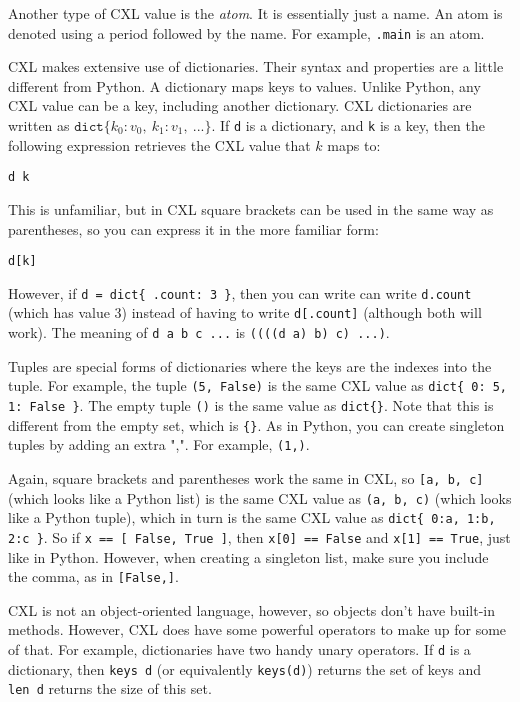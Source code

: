 \documentclass{report}
\newenvironment{code}{
\tcolorbox
}{
\endtcolorbox
}
\begin{document}
Another type of CXL value is the \emph{atom}.  It is essentially
just a name.  An atom is denoted using a period followed by the
name.  For example, \texttt{.main} is an atom.

CXL makes extensive use of dictionaries.  Their syntax and properties
are a little different from Python.
A dictionary maps keys to values.
Unlike Python, any CXL value can be a key, including another
dictionary.
CXL dictionaries are written as
$\mathtt{dict}\{ k_0: v_0, ~ k_1: v_1, ~ ... \}$.
If \texttt{d} is a dictionary, and \texttt{k} is a key, then the
following expression retrieves the CXL value that $k$ maps to:
\begin{code}
\begin{verbatim}
d k
\end{verbatim}
\end{code}
This is unfamiliar, but in CXL square brackets can be used in the
same way as parentheses, so you can express it in the more familiar
form:
\begin{code}
\begin{verbatim}
d[k]
\end{verbatim}
\end{code}
However, if \texttt{d = dict\{ .count: 3 \}}, then you can write
can write \texttt{d.count} (which has value 3) instead of having to write
\texttt{d[.count]} (although both will work).
The meaning of \texttt{d a b c ...} is \texttt{((((d a) b) c) ...)}.

Tuples are special forms of dictionaries where the keys are
the indexes into the tuple.  For example, the tuple
\texttt{(5, False)} is the same CXL value as
\texttt{dict\{ 0: 5, 1: False \}}.
The empty tuple \texttt{()} is the same value as \texttt{dict\{\}}.
Note that this is different from the empty set, which is \texttt{\{\}}.
As in Python, you can create singleton tuples by adding an
extra ",". For example, \texttt{(1,)}.

Again, square brackets and parentheses work the same in CXL, so
\texttt{[a, b, c]} (which looks like a Python list)
is the same CXL value as \texttt{(a, b, c)} (which looks like a Python tuple),
which in turn is the same CXL value as \texttt{dict\{ 0:a, 1:b, 2:c \}}.
So if \texttt{x == [ False, True ]},
then \texttt{x[0] == False} and \texttt{x[1] == True}, just like in Python.
However, when creating a singleton list, make sure you include the
comma, as in \texttt{[False,]}.

CXL is not an object-oriented language, however, so objects don't have
built-in methods.  However, CXL does have some powerful operators to
make up for some of that.
For example, dictionaries have two handy unary operators.
If \texttt{d} is a
dictionary, then \texttt{keys~d} (or equivalently \texttt{keys(d)})
returns the set of keys and \texttt{len~d} returns the size of
this set.
\end{document}
